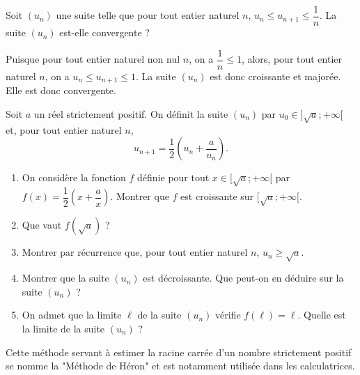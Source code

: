 \documentclass[11pt,fleqn, openany]{book} %
\begin{document}
\begin{exercise}[topic=lim13, subtitle={(Métropole 2022)}]Soit $(u_n)$ une suite telle que pour tout entier naturel $n$, $u_n \leqslant u_{n+1} \leqslant \dfrac{1}{n}$. La suite $(u_n)$ est-elle convergente ?\end{exercise}

\begin{solution}Puisque pour tout entier naturel non nul $n$, on a $\dfrac{1}{n}\leqslant 1$, alors, pour tout entier naturel $n$, on a $u_n\leqslant u_{n+1} \leqslant 1$. La suite $(u_n)$ est donc croissante et majorée. Elle est donc convergente.\end{solution}





\begin{exercise}[topic=lim13]

Soit $a$ un réel strictement positif. On définit la suite $(u_n)$ par $u_0\in ]\sqrt{a};+\infty[$ et, pour tout entier naturel $n$,
\[u_{n+1}=\dfrac{1}{2}\left(u_n+\dfrac{a}{u_n}\right).\]
\begin{enumerate}
\item On considère la fonction $f$ définie pour tout $x\in [ \sqrt{a};+\infty[$ par $f(x)=\dfrac{1}{2}\left( x+\dfrac{a}{x}\right)$. Montrer que $f$ est croissante sur $ [ \sqrt{a};+\infty[$.
\item Que vaut $f(\sqrt{a})$ ?
\item Montrer par récurrence que, pour tout entier naturel $n$, $u_n\geqslant \sqrt{a}$.
\item Montrer que la suite $(u_n)$ est décroissante. Que peut-on en déduire sur la suite $(u_n)$ ? 
\item On admet que la limite $\ell$ de la suite $(u_n)$ vérifie $f(\ell)=\ell$. Quelle est la limite de la suite $(u_n)$ ?
\end{enumerate}
Cette méthode servant à estimer la racine carrée d'un nombre strictement positif se nomme la "Méthode de Héron" et est notamment utilisée dans les calculatrices.\end{exercise}
\end{document}
